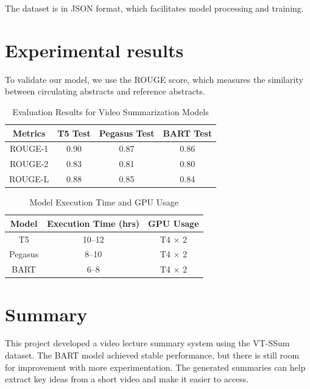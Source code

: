 \documentclass[conference]{IEEEtran}
\begin{document}
The dataset is in JSON format, which facilitates model processing and training.

\section{Experimental results}
To validate our model, we use the ROUGE score, which measures the similarity between circulating abstracts and reference abstracts.

\begin{table}[htbp]
\centering
\begin{tabular}{|c|c|c|c|}
\hline
\textbf{Metrics} & \textbf{T5 Test} & \textbf{Pegasus Test} & \textbf{BART Test} \\
\hline
ROUGE-1 & 0.90 & 0.87 & 0.86 \\
ROUGE-2 & 0.83 & 0.81 & 0.80 \\
ROUGE-L & 0.88 & 0.85 & 0.84 \\
\hline
\end{tabular}
\caption{Evaluation Results for Video Summarization Models}
\label{table:results}
\end{table}



\begin{table}[h]
\centering

\label{tab:execution_time}
\begin{tabular}{|c|c|c|}
\hline
\textbf{Model} & \textbf{Execution Time (hrs)} & \textbf{GPU Usage} \\ \hline
T5            & 10--12                        & T4 $\times$ 2      \\ \hline
Pegasus       & 8--10                         & T4 $\times$ 2      \\ \hline
BART          & 6--8                          & T4 $\times$ 2      \\ \hline
\end{tabular}
\caption{Model Execution Time and GPU Usage}
\end{table}




\section{Summary}
This project developed a video lecture summary system using the VT-SSum dataset. The BART model achieved stable performance, but there is still room for improvement with more experimentation. The generated summaries can help extract key ideas from a short video and make it easier to access.
\end{document}
